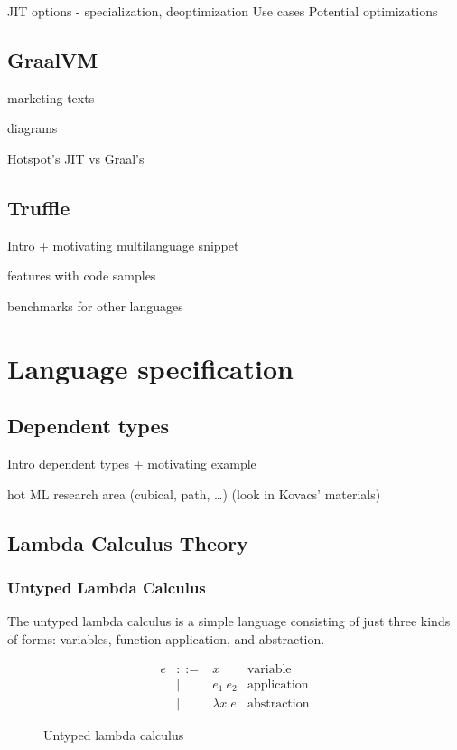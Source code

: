 \documentclass[english,zadani,odsaz]{fitthesis}
\begin{document}
JIT options - specialization, deoptimization
Use cases
Potential optimizations
\section{GraalVM}
\label{sec:orgcc19adc}
marketing texts

diagrams

Hotspot's JIT vs Graal's

\section{Truffle}
\label{sec:org9dbdbb8}
Intro + motivating multilanguage snippet

features with code samples

benchmarks for other languages

\chapter{Language specification}
\label{sec:orgc59e533}
\section{Dependent types}
\label{sec:org0762d55}
Intro dependent types + motivating example

hot ML research area (cubical, path, \ldots{}) (look in Kovacs' materials)

\section{Lambda Calculus Theory}
\label{sec:org8d4a078}
\subsection{Untyped Lambda Calculus}
\label{sec:orgbd1c553}
The untyped lambda calculus is a simple language consisting of just three kinds
of forms: variables, function application, and abstraction.

\begin{figure}[!htpb]
\[\begin{array}{ccll}
e & ::= & x            & \text{variable} \\
  & |   & e_1~e_2      & \text{application} \\
  & |   & \lambda x. e & \text{abstraction}
\end{array}\]
\caption{Untyped lambda calculus}
\end{figure}
\end{document}
